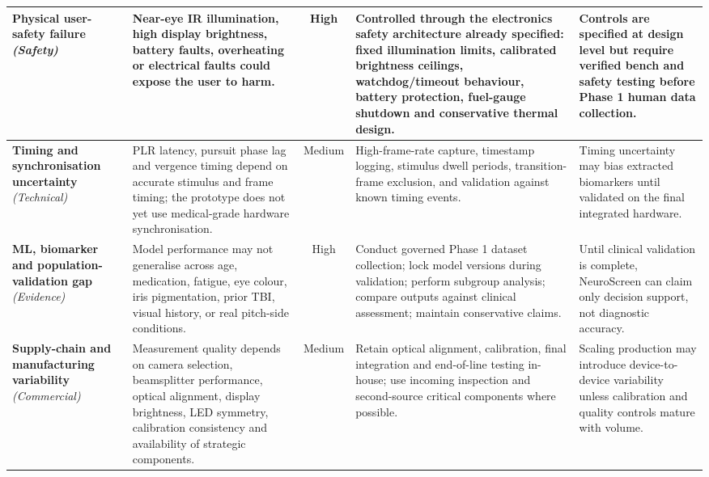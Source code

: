 \begin{table}[htbp]
\begin{tabular}{p{2.6cm}p{3.6cm}cp{4cm}p{3.4cm}}
        \midrule
        \textbf{Physical user-safety failure} \emph{(Safety)}
            & Near-eye IR illumination, high display brightness, battery faults, overheating or electrical faults could expose the user to harm.
            & High
            & Controlled through the electronics safety architecture already specified: fixed illumination limits, calibrated brightness ceilings, watchdog/timeout behaviour, battery protection, fuel-gauge shutdown and conservative thermal design.
            & Controls are specified at design level but require verified bench and safety testing before Phase 1 human data collection. \\
        \midrule
        \textbf{Timing and synchronisation uncertainty} \emph{(Technical)}
            & PLR latency, pursuit phase lag and vergence timing depend on accurate stimulus and frame timing; the prototype does not yet use medical-grade hardware synchronisation.
            & Medium
            & High-frame-rate capture, timestamp logging, stimulus dwell periods, transition-frame exclusion, and validation against known timing events.
            & Timing uncertainty may bias extracted biomarkers until validated on the final integrated hardware. \\
        \midrule
        \textbf{ML, biomarker and population-validation gap} \emph{(Evidence)}
            & Model performance may not generalise across age, medication, fatigue, eye colour, iris pigmentation, prior TBI, visual history, or real pitch-side conditions.
            & High
            & Conduct governed Phase 1 dataset collection; lock model versions during validation; perform subgroup analysis; compare outputs against clinical assessment; maintain conservative claims.
            & Until clinical validation is complete, NeuroScreen can claim only decision support, not diagnostic accuracy. \\
        \midrule
        \textbf{Supply-chain and manufacturing variability} \emph{(Commercial)}
            & Measurement quality depends on camera selection, beamsplitter performance, optical alignment, display brightness, LED symmetry, calibration consistency and availability of strategic components.
            & Medium
            & Retain optical alignment, calibration, final integration and end-of-line testing in-house; use incoming inspection and second-source critical components where possible.
            & Scaling production may introduce device-to-device variability unless calibration and quality controls mature with volume. \\
        \bottomrule
    \end{tabular}
\end{table}


